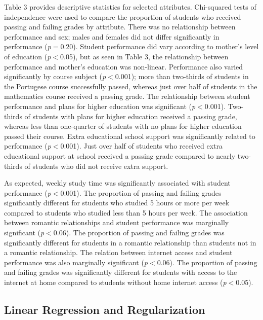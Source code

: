 \documentclass[sigconf]{acmart}
\begin{document}
Table 3 provides descriptive statistics for selected attributes. Chi-squared 
tests of independence were used to compare the proportion of students who 
received passing and failing grades by attribute. There was no relationship
between performance and sex; males and females did not differ significantly 
in performance (\textit{p}$=$0.20). Student performance did vary 
according to mother's level of education (\textit{p}$<$0.05), but 
as seen in Table 3, the relationship between performance and mother's 
education was non-linear. Performance also varied significantly by course 
subject (\textit{p}$<$0.001); more than two-thirds of students in 
the Portugese course successfully passed, whereas just over half of students 
in the mathematics course received a passing grade. The relationship between 
student performance and plans for higher education was significant 
(\textit{p}$<$0.001). Two-thirds of students with plans for 
higher education received a passing grade, whereas less than one-quarter of 
students with no plans for higher education passed their course. Extra 
educational school support was significantly related to performance 
(\textit{p}$<$0.001). Just over half of students who received 
extra educational support at school received a passing grade compared to 
nearly two-thirds of students who did not receive extra support. 

As expected, weekly study time was significantly associated with student 
performance (\textit{p}$<$0.001). The proportion of passing and 
failing grades significantly different for students who studied 5 hours or 
more per week compared to students who studied less than 5 hours per week. 
The association between romantic relationships and student performance 
was marginally significant (\textit{p}$<$0.06). The proportion 
of passing and failing grades was significantly different for students in 
a romantic relationship than students not in a romantic relationship. The 
relation between internet access and student performance was also marginally 
significant (\textit{p}$<$0.06). The proportion of passing and
failing grades was significantly different for students with access to the 
internet at home compared to students without home internet access 
(\textit{p}$<$0.05).


\subsection{Linear Regression and Regularization}
\end{document}
